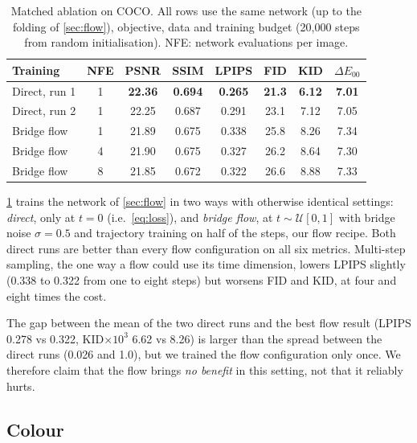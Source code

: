 \documentclass[10pt,twocolumn,letterpaper]{article}
\begin{document}
\begin{table}[t]
\centering
\small
\setlength{\tabcolsep}{3pt}
\caption{Matched ablation on COCO. All rows use the same network (up to the folding of \cref{sec:flow}), objective,
data and training budget (20{,}000 steps from random initialisation). NFE: network evaluations per image.}
\label{tab:ablation}
\begin{tabular}{lccccccc}
\toprule
Training & NFE & PSNR & SSIM & LPIPS & FID & KID & $\Delta E_{00}$ \\
\midrule
Direct, run 1 & 1 & \textbf{22.36} & \textbf{0.694} & \textbf{0.265} & \textbf{21.3} & \textbf{6.12} & \textbf{7.01} \\
Direct, run 2 & 1 & 22.25 & 0.687 & 0.291 & 23.1 & 7.12 & 7.05 \\
\midrule
Bridge flow & 1 & 21.89 & 0.675 & 0.338 & 25.8 & 8.26 & 7.34 \\
Bridge flow & 4 & 21.90 & 0.675 & 0.327 & 26.2 & 8.64 & 7.30 \\
Bridge flow & 8 & 21.85 & 0.672 & 0.322 & 26.6 & 8.88 & 7.33 \\
\bottomrule
\end{tabular}
\end{table}

\cref{tab:ablation} trains the network of \cref{sec:flow} in two ways with otherwise identical settings: \emph{direct},
only at $t{=}0$ (i.e.\ \cref{eq:loss}), and \emph{bridge flow}, at $t\sim\mathcal{U}[0,1]$ with bridge noise
$\sigma=0.5$ and trajectory training on half of the steps, our flow recipe. Both direct runs are
better than every flow configuration on all six metrics. Multi-step sampling, the one way a flow could use its time
dimension, lowers LPIPS slightly (0.338 to 0.322 from one to eight steps) but worsens FID and KID, at four and eight
times the cost.

The gap between the mean of the two direct runs and the best flow result (LPIPS 0.278 vs 0.322, KID$\times10^3$ 6.62 vs
8.26) is larger than the spread between the direct runs (0.026 and 1.0), but we trained the flow configuration only
once. We therefore claim that the flow brings \emph{no benefit} in this setting, not that it reliably hurts.

\subsection{Colour}
\label{sec:colour}
\end{document}
